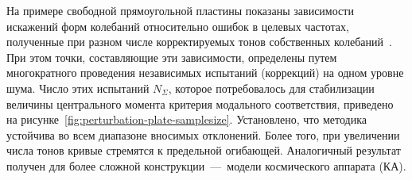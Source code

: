 На примере свободной прямоугольной пластины показаны зависимости искажений форм колебаний относительно ошибок в целевых частотах, полученные при разном числе корректируемых тонов собственных колебаний~. При этом точки, составляющие эти зависимости, определены путем многократного проведения независимых испытаний (коррекций) на одном уровне шума. Число этих испытаний $ N_\Sigma $, которое потребовалось для стабилизации величины центрального момента критерия модального соответствия, приведено на рисунке~\ref{fig:perturbation-plate-samplesize}. Установлено, что методика устойчива во всем диапазоне вносимых отклонений. Более того, при увеличении числа тонов кривые стремятся к предельной огибающей. Аналогичный результат получен для более сложной конструкции~---~модели космического аппарата (КА).

